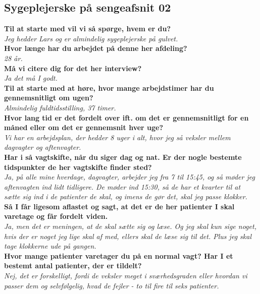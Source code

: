 \subsection{Sygeplejerske på sengeafsnit 02} \label{bilagO2}
\textbf{Til at starte med vil vi så spørge, hvem er du?}\\
\noindent
\textit{Jeg hedder Lars og er almindelig sygeplejerske på gulvet.}\\
\noindent
\textbf{Hvor længe har du arbejdet på denne her afdeling?} \\
\noindent
\textit{28 år.}\\
\noindent
\textbf{Må vi citere dig for det her interview?}\\
\noindent
\textit{Ja det må I godt.}\\
\noindent
\textbf{Til at starte med at høre, hvor mange arbejdstimer har du gennemsnitligt om ugen?}\\
\noindent
\textit{Almindelig fuldtidsstilling, 37 timer.}\\
\noindent
\textbf{Hvor lang tid er det fordelt over ift. om det er gennemsnitligt for en måned eller om det er gennemsnit hver uge?}\\
\noindent
\textit{Vi har en arbejdsplan, der hedder 8 uger i alt, hvor jeg så veksler mellem dagvagter og aftenvagter.}\\
\noindent
\textbf{Har i så vagtskifte, når du siger dag og nat. Er der nogle bestemte tidspunkter de her vagtskifte finder sted?}\\
\noindent
\textit{Ja, på alle mine hverdage, dagvagter, arbejder jeg fra 7 til 15:45, og så møder jeg aftenvagten ind lidt tidligere. De møder ind 15:30, så de har et kvarter til at sætte sig ind i de patienter de skal, og imens de gør det, skal jeg passe klokker.}\\
\noindent
\textbf{Så I får ligesom aflastet og sagt, at det er de her patienter I skal varetage og får fordelt viden.}\\
\noindent
\textit{Ja, men det er meningen, at de skal sætte sig og læse. Og jeg skal kun sige noget, hvis der er noget jeg lige skal af med, ellers skal de læse sig til det. Plus jeg skal tage klokkerne ude på gangen.}\\
\noindent
\textbf{Hvor mange patienter varetager du på en normal vagt? Har I et bestemt antal patienter, der er tildelt?}\\
\noindent
\textit{Nej, det er forskelligt, fordi de veksler meget i sværhedsgraden eller hvordan vi passer dem og selvfølgelig, hvad de fejler - to til fire til seks patienter.}\\
